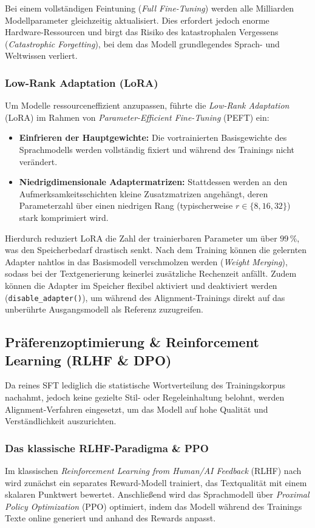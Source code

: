 Bei einem vollständigen Feintuning (\textit{Full Fine-Tuning}) werden alle Milliarden Modellparameter gleichzeitig aktualisiert. Dies erfordert jedoch enorme Hardware-Ressourcen und birgt das Risiko des katastrophalen Vergessens (\textit{Catastrophic Forgetting}), bei dem das Modell grundlegendes Sprach- und Weltwissen verliert.

\subsubsection{Low-Rank Adaptation (LoRA)}
Um Modelle ressourceneffizient anzupassen, führte \citet{hu2022lora} die \textit{Low-Rank Adaptation} (LoRA) im Rahmen von \textit{Parameter-Efficient Fine-Tuning} (PEFT) ein:
\begin{itemize}
    \item \textbf{Einfrieren der Hauptgewichte:} Die vortrainierten Basisgewichte des Sprachmodells werden vollständig fixiert und während des Trainings nicht verändert.
    \item \textbf{Niedrigdimensionale Adaptermatrizen:} Stattdessen werden an den Aufmerksamkeitsschichten kleine Zusatzmatrizen angehängt, deren Parameterzahl über einen niedrigen Rang (typischerweise $r \in \{8, 16, 32\}$) stark komprimiert wird.
\end{itemize}
Hierdurch reduziert LoRA die Zahl der trainierbaren Parameter um über $99\,\%$, was den Speicherbedarf drastisch senkt. Nach dem Training können die gelernten Adapter nahtlos in das Basismodell verschmolzen werden (\textit{Weight Merging}), sodass bei der Textgenerierung keinerlei zusätzliche Rechenzeit anfällt. Zudem können die Adapter im Speicher flexibel aktiviert und deaktiviert werden (\texttt{disable\_adapter()}), um während des Alignment-Trainings direkt auf das unberührte Ausgangsmodell als Referenz zuzugreifen.

\subsection{Präferenzoptimierung \& Reinforcement Learning (RLHF \& DPO)}
\label{sec:rlhf_dpo_ppo_theorie}

Da reines SFT lediglich die statistische Wortverteilung des Trainingskorpus nachahmt, jedoch keine gezielte Stil- oder Regeleinhaltung belohnt, werden Alignment-Verfahren eingesetzt, um das Modell auf hohe Qualität und Verständlichkeit auszurichten.

\subsubsection{Das klassische RLHF-Paradigma \& PPO}
Im klassischen \textit{Reinforcement Learning from Human/AI Feedback} (RLHF) nach \citet{ouyang2022training} wird zunächst ein separates Reward-Modell trainiert, das Textqualität mit einem skalaren Punktwert bewertet. Anschließend wird das Sprachmodell über \textit{Proximal Policy Optimization} (PPO) \citep{schulman2017proximal} optimiert, indem das Modell während des Trainings Texte online generiert und anhand des Rewards anpasst.

